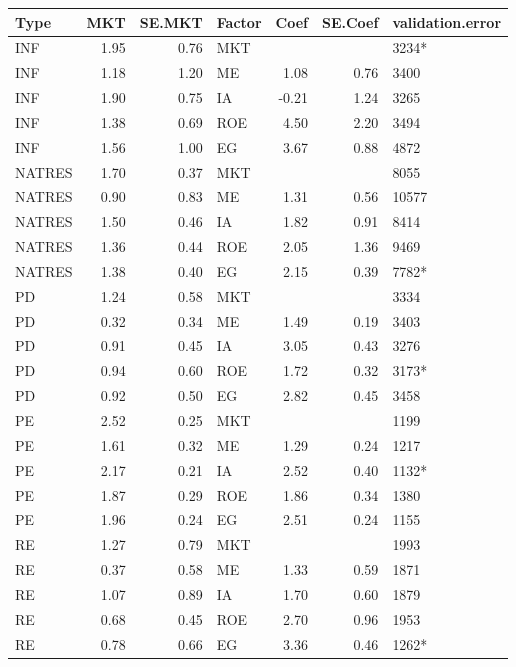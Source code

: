 \documentclass[12pt]{article}
\begin{document}
\begin{table}[ht]
	\centering
	\begin{tabular}{lrrlrrl}
		Type & MKT & SE.MKT & Factor & Coef & SE.Coef & validation.error \\ 
		\hline
		\hline
		INF & 1.95 & 0.76 & MKT &  &  & 3234* \\ 
		INF & 1.18 & 1.20 & ME & 1.08 & 0.76 & 3400 \\ 
		INF & 1.90 & 0.75 & IA & -0.21 & 1.24 & 3265 \\ 
		INF & 1.38 & 0.69 & ROE & 4.50 & 2.20 & 3494 \\ 
		INF & 1.56 & 1.00 & EG & 3.67 & 0.88 & 4872 \\ 
		\hline
		NATRES & 1.70 & 0.37 & MKT &  &  & 8055 \\ 
		NATRES & 0.90 & 0.83 & ME & 1.31 & 0.56 & 10577 \\ 
		NATRES & 1.50 & 0.46 & IA & 1.82 & 0.91 & 8414 \\ 
		NATRES & 1.36 & 0.44 & ROE & 2.05 & 1.36 & 9469 \\ 
		NATRES & 1.38 & 0.40 & EG & 2.15 & 0.39 & 7782* \\ 
		\hline
		PD & 1.24 & 0.58 & MKT &  &  & 3334 \\ 
		PD & 0.32 & 0.34 & ME & 1.49 & 0.19 & 3403 \\ 
		PD & 0.91 & 0.45 & IA & 3.05 & 0.43 & 3276 \\ 
		PD & 0.94 & 0.60 & ROE & 1.72 & 0.32 & 3173* \\ 
		PD & 0.92 & 0.50 & EG & 2.82 & 0.45 & 3458 \\ 
		\hline
		PE & 2.52 & 0.25 & MKT &  &  & 1199 \\ 
		PE & 1.61 & 0.32 & ME & 1.29 & 0.24 & 1217 \\ 
		PE & 2.17 & 0.21 & IA & 2.52 & 0.40 & 1132* \\ 
		PE & 1.87 & 0.29 & ROE & 1.86 & 0.34 & 1380 \\ 
		PE & 1.96 & 0.24 & EG & 2.51 & 0.24 & 1155 \\ 
		\hline
		RE & 1.27 & 0.79 & MKT &  &  & 1993 \\ 
		RE & 0.37 & 0.58 & ME & 1.33 & 0.59 & 1871 \\ 
		RE & 1.07 & 0.89 & IA & 1.70 & 0.60 & 1879 \\ 
		RE & 0.68 & 0.45 & ROE & 2.70 & 0.96 & 1953 \\ 
		RE & 0.78 & 0.66 & EG & 3.36 & 0.46 & 1262* \\

\end{tabular}
\end{table}
\end{document}
